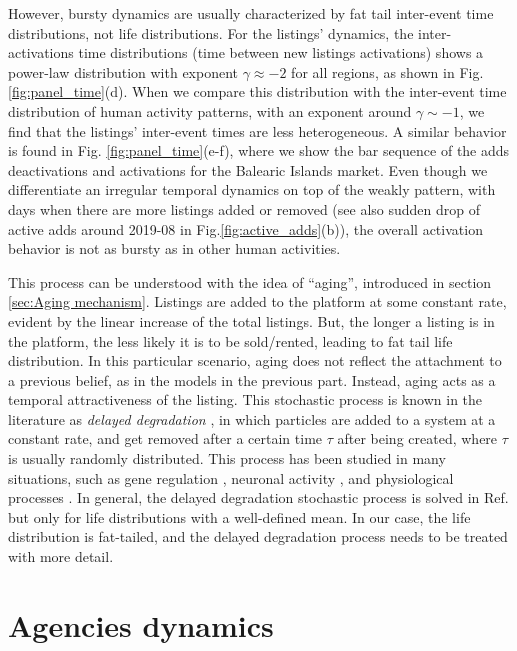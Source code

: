 However, bursty dynamics are usually characterized by fat tail inter-event time distributions, not life distributions. For the listings' dynamics, the inter-activations time distributions (time between new listings activations) shows a power-law distribution with exponent $\gamma \approx -2$ for all regions, as shown in Fig. \ref{fig:panel_time}(d). When we compare this distribution with the inter-event time distribution of human activity patterns, with an exponent around $\gamma \sim -1$, we find that the listings' inter-event times are less heterogeneous. A similar behavior is found in Fig. \ref{fig:panel_time}(e-f), where we show the bar sequence of the adds deactivations and activations for the Balearic Islands market. Even though we differentiate an irregular temporal dynamics on top of the weakly pattern, with days when there are more listings added or removed (see also sudden drop of active adds around 2019-08 in Fig.\ref{fig:active_adds}(b)), the overall activation behavior is not as bursty as in other human activities.

This process can be understood with the idea of ``aging'', introduced in section \ref{sec:Aging mechanism}. Listings are added to the platform at some constant rate, evident by the linear increase of the total listings. But, the longer a listing is in the platform, the less likely it is to be sold/rented, leading to fat tail life distribution. In this particular scenario, aging does not reflect the attachment to a previous belief, as in the models in the previous part. Instead, aging acts as a temporal attractiveness of the listing. This stochastic process is known in the literature as \textit{delayed degradation} \cite{lafuerza2013stochastic}, in which particles are added to a system at a constant rate, and get removed after a certain time $\tau$ after being created, where $\tau$ is usually randomly distributed. This process has been studied in many situations, such as gene regulation \cite{lewis2003autoinhibition, barrio2006oscillatory, bratsun2005delay}, neuronal activity \cite{flunkert2013dynamics}, and physiological processes \cite{longtin1990noise}. In general, the delayed degradation stochastic process is solved in Ref. \cite{lafuerza2013stochastic} but only for life distributions with a well-defined mean. In our case, the life distribution is fat-tailed, and the delayed degradation process needs to be treated with more detail.

\section{Agencies dynamics}

